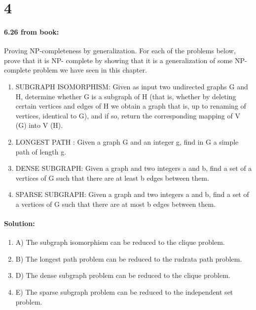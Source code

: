 \documentclass[12pt]{article}
\begin{document}
\section*{4}
\paragraph{6.26 from book:}
Proving NP-completeness by generalization. For each of the problems below, prove that it is NP-
complete by showing that it is a generalization of some NP-complete problem we have seen in
this chapter.
\begin{enumerate}
\item  SUBGRAPH ISOMORPHISM: Given as input two undirected graphs G and H, determine
        whether G is a subgraph of H (that is, whether by deleting certain vertices and edges of H
        we obtain a graph that is, up to renaming of vertices, identical to G), and if so, return the
        corresponding mapping of V (G) into V (H).

\item LONGEST PATH :
        Given a graph G and an integer g, find in G a simple path of length g.

\item  DENSE SUBGRAPH: Given a graph and two integers a and b, find a set of a vertices of G
        such that there are at least b edges between them.

\item SPARSE SUBGRAPH: Given a graph and two integers a and b, find a set of a vertices of G
        such that there are at most b edges between them.
\end{enumerate}

\paragraph{Solution:}
\begin{enumerate}

\item A) The subgraph isomorphism can be reduced to the clique problem.

\item B) The longest path problem can be reduced to the rudrata path problem.

\item D) The dense subgraph problem can be reduced to the clique problem.

\item E) The sparse subgraph problem can be reduced to the independent set problem.

\end{enumerate}
\end{document}
